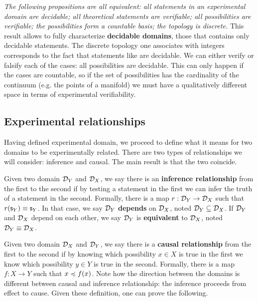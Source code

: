 \documentclass[twocolumn]{article}
\begin{document}
\textit{The following propositions are all equivalent: all statements in an experimental domain are decidable; all theoretical statements are verifiable; all possibilities are verifiable; the possibilities form a countable basis; the topology is discrete.} This result allows to fully characterize \textbf{decidable domains}, those that contains only decidable statements. The discrete topology one associates with integers corresponds to the fact that statements like  are decidable. We can either verify or falsify each of the cases: all possibilities are decidable. This can only happen if the cases are countable, so if the set of possibilities has the cardinality of the continuum (e.g. the points of a manifold) we must have a qualitatively different space in terms of experimental verifiability.

\subsection{Experimental relationships}

Having defined experimental domain, we proceed to define what it means for two domains to be experimentally related. There are two types of relationships we will consider: inference and causal. The main result is that the two coincide.

Given two domain $\mathcal{D}_Y$ and $\mathcal{D}_X$, we say there is an \textbf{inference relationship} from the first to the second if by testing a statement in the first we can infer the truth of a statement in the second. Formally, there is a map $r : \mathcal{D}_Y \to \mathcal{D}_X$ such that $r(\mathsf{s}_Y) \equiv \mathsf{s}_Y$. In that case, we say $\mathcal{D}_Y$ \textbf{depends} on $\mathcal{D}_X$, noted $\mathcal{D}_Y \subseteq \mathcal{D}_X$. If $\mathcal{D}_Y$ and $\mathcal{D}_X$ depend on each other, we say  $\mathcal{D}_Y$ is \textbf{equivalent} to $\mathcal{D}_X$, noted $\mathcal{D}_Y \equiv \mathcal{D}_X$.

Given two domain $\mathcal{D}_X$ and $\mathcal{D}_Y$, we say there is a \textbf{causal relationship} from the first to the second if by knowing which possibility $x \in X$ is true in the first we know which possibility $y \in Y$ is true in the second. Formally, there is a map $f : X \to Y$ such that $x \preccurlyeq f(x)$. Note how the direction between the domains is different between causal and inference relationship: the inference proceeds from effect to cause. Given these definition, one can prove the following.
\end{document}
